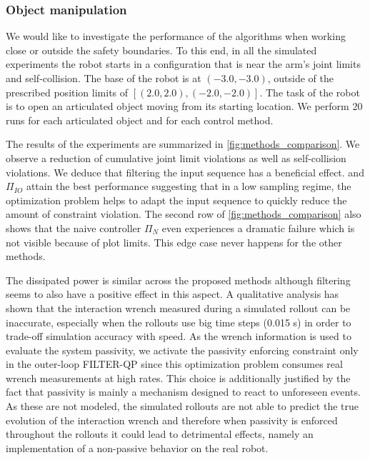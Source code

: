 
\vspace{0.3cm}
\subsubsection{Object manipulation}
We would like to investigate the performance of the algorithms when working close or outside the safety boundaries. To this end, in all the simulated experiments the robot starts in a configuration that is near the arm's joint limits and self-collision. The base of the robot is at $(-3.0, -3.0)$, outside of the prescribed position limits of $[(2.0, 2.0), (-2.0, -2.0)]$. The task of the robot is to open an articulated object moving from its starting location. We perform 20 runs for each articulated object and for each control method.

The results of the experiments are summarized in \fig \ref{fig:methods_comparison}. We observe a reduction of cumulative joint limit violations as well as self-collision violations. We deduce that filtering the input sequence has a beneficial effect. \ctrlOuter and $\Pi_{IO}$ attain the best performance suggesting that in a low sampling regime, the optimization problem helps to adapt the input sequence to quickly reduce the amount of constraint violation. The second row of \fig \ref{fig:methods_comparison} also shows that the naive controller $\Pi_{N}$ even experiences a dramatic failure which is not visible because of plot limits. This edge case never happens for the other methods. 

The dissipated power is similar across the proposed methods although filtering seems to also have a positive effect in this aspect. A qualitative analysis has shown that the interaction wrench measured during a simulated rollout can be inaccurate, especially when the rollouts use big time steps (0.015 s) in order to trade-off simulation accuracy with speed. As the wrench information is used to evaluate the system passivity, we activate the passivity enforcing constraint only in the outer-loop FILTER-QP since this optimization problem consumes real wrench measurements at high rates. This choice is additionally justified by the fact that passivity is mainly a mechanism designed to react to unforeseen events. As these are not modeled, the simulated rollouts are not able to predict the true evolution of the interaction wrench and therefore when passivity is enforced throughout the rollouts it could lead to detrimental effects, namely an implementation of a non-passive behavior on the real robot.


